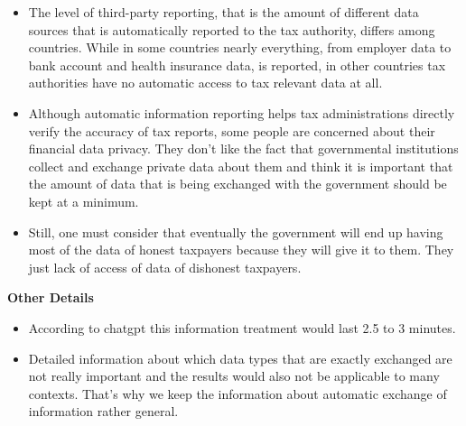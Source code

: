 \documentclass[12pt]{article}
\begin{document}
\begin{itemize}
    \item The level of third-party reporting, that is the amount of different data sources that is automatically reported to the tax authority, differs among countries. While in some countries nearly everything, from employer data to bank account and health insurance data, is reported, in other countries tax authorities have no automatic access to tax relevant data at all.   
    \item Although automatic information reporting helps tax administrations directly verify the accuracy of tax reports, some people are concerned about their financial data privacy. They don't like the fact that governmental institutions collect and exchange private data about them and think it is important that the amount of data that is being exchanged with the government should be kept at a minimum.
    \item Still, one must consider that eventually the government will end up having most of the data of honest taxpayers because they will give it to them. They just lack of access of data of dishonest taxpayers.  
\end{itemize}
\textbf{Other Details}
\begin{itemize}
    \item According to chatgpt this information treatment would last 2.5 to 3 minutes.
    \item Detailed information about which data types that are exactly exchanged are not really important and the results would also not be applicable to many contexts. That's why we keep the information about automatic exchange of information rather general.  
\end{itemize}
\end{document}
